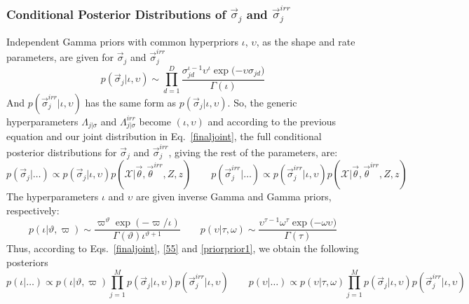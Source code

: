 \documentclass[journal,10pt]{elsart}
\begin{document}
\subsubsection{Conditional Posterior Distributions of $\vec{\sigma}_j$ and $\vec{\sigma}_j^{irr}$} Independent Gamma priors with common hyperpriors $\iota$, $\upsilon$, as the shape and rate parameters, are given for $\vec{\sigma}_j$ and $\vec{\sigma}_j^{irr}$
\begin{equation}\label{55}
 p(\vec{\sigma}_j|\iota,\upsilon)\sim\prod_{d=1}^D\frac{\sigma_{jd}^{\iota-1}\upsilon^{\iota}\exp\big({-\upsilon
\sigma_{jd}}\big)}{\Gamma(\iota)}
\end{equation}
And $p(\vec{\sigma}_j^{irr}|\iota,\upsilon)$ has the same form as $p(\vec{\sigma}_j|\iota,\upsilon)$. So, the generic hyperparameters $\Lambda_{j|\sigma}$ and $\Lambda_{j|\sigma}^{irr}$ become $(\iota,\upsilon)$ and according to the previous equation and our joint distribution in Eq.~\ref{finaljoint}, the full conditional posterior distributions for $\vec{\sigma}_j$ and $\vec{\sigma}_j^{irr}$, giving the rest of the parameters, are:
\begin{equation}\label{sigmaposterior}
p(\vec{\sigma}_j|\ldots) \propto p(\vec{\sigma}_j|\iota,\upsilon)p(\mathcal{X}|\vec{\theta},\vec{\theta}^{irr},Z,z) \qquad
p(\vec{\sigma}_j^{irr}|\ldots) \propto p(\vec{\sigma}_j^{irr}|\iota,\upsilon)p(\mathcal{X}|\vec{\theta},\vec{\theta}^{irr},Z,z)
\end{equation}
The hyperparameters $\iota$ and $\upsilon$ are given inverse Gamma and Gamma priors, respectively:
\begin{equation}\label{priorprior1}
p(\iota|\vartheta,\varpi) \sim \frac{\varpi^\vartheta\exp(-\varpi/
\iota)}{\Gamma(\vartheta)\iota^{\vartheta+1}} \qquad
p(\upsilon|\tau,\omega) \sim \frac{\upsilon^{\tau-1}\omega^{\tau}\exp\big({-\omega
\upsilon}\big)}{\Gamma(\tau)}
\end{equation}
Thus, according to Eqs.~\ref{finaljoint}, \ref{55} and \ref{priorprior1}, we obtain the following posteriors
\begin{equation}\label{posteriors111}
p(\iota|\ldots) \propto p(\iota|\vartheta,\varpi) \prod_{j=1}^M p(\vec{\sigma}_j|\iota,\upsilon)p(\vec{\sigma}_j^{irr}|\iota,\upsilon) \qquad p(\upsilon|\ldots) \propto p(\upsilon|\tau,\omega)\prod_{j=1}^M p(\vec{\sigma}_j|\iota,\upsilon)p(\vec{\sigma}_j^{irr}|\iota,\upsilon)
\end{equation}
\end{document}
